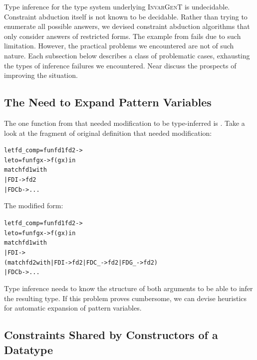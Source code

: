 \documentclass{article}
\newcommand{\tmname}[1]{\textsc{#1}}
\newcommand{\tmverbatim}[1]{{\ttfamily{#1}}}
\newenvironment{tmcode}[1][]{\begin{alltt}}{\end{alltt}}
\begin{document}
Type inference for the type system underlying {\tmname{InvarGenT}} is
undecidable. Constraint abduction itself is not known to be decidable. Rather
than trying to enumerate all possible answers, we devised constraint abduction
algorithms that only consider answers of restricted forms. The
\tmverbatim{vary} example from {\cite{PracticalGADTsInfer}} fails due to such
limitation. However, the practical problems we encountered are not of such
nature. Each subsection below describes a class of problematic cases,
exhausting the types of inference failures we encountered. Near discuss the
prospects of improving the situation.

\subsection{The Need to Expand Pattern Variables}

The one function from {\cite{PracticalGADTsInfer}} that needed modification to
be type-inferred is \tmverbatim{fd\_comp}. Take a look at the fragment of
original definition that needed modification:
\begin{tmcode}
let fd_comp = fun fd1 fd2 ->
  let o = fun f g x -> f (g x) in
  match fd1 with
    | FDI -> fd2
    | FDC b -> ...
\end{tmcode}
The modified form:
\begin{tmcode}
let fd_comp = fun fd1 fd2 ->
  let o = fun f g x -> f (g x) in
  match fd1 with
    | FDI ->
      (match fd2 with | FDI -> fd2 | FDC _ -> fd2 | FDG _ -> fd2)
    | FDC b -> ...
\end{tmcode}
Type inference needs to know the structure of both arguments to be able to
infer the resulting type. If this problem proves cumbersome, we can devise
heuristics for automatic expansion of pattern variables.

\subsection{Constraints Shared by Constructors of a Datatype}
\end{document}
